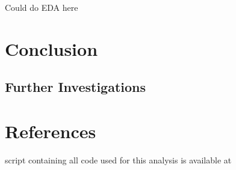 \documentclass[12pt]{article}\usepackage[]{graphicx}\usepackage[]{color}
\begin{document}
Could do EDA here

\section{Conclusion}

\subsection{Further Investigations}

\newpage
\section{References}
\begingroup
\renewcommand{\section}[2]{}%
\begin{flushleft}

%
%
%
%

\end{flushleft}
\endgroup

\newpage
\section{Appendix - R Code}

A script containing all code used for this analysis is available at \\

\singlespacing
\end{document}
